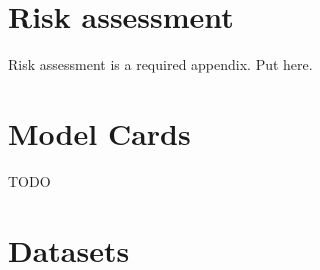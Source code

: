 \begin{uomappendix}
            
            
            
        
        \section{Risk assessment}
            \begin{temp}
                Risk assessment is a required appendix. Put here.
            \end{temp}
    
        \section{Model Cards}
            \begin{temp}
                TODO
            \end{temp}
    
        \section{Datasets}
    

\end{uomappendix}
